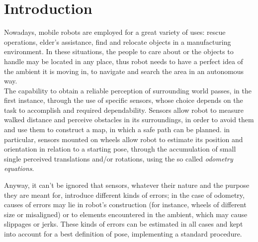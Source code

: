 \documentclass[a4paper, onecolumn]{report}
\begin{document}
\Large
\sloppy

\tableofcontents
\newpage

\chapter{Introduction}
Nowadays, mobile robots are employed for a great variety of uses: rescue operations, elder's assistance, find and relocate objects in a manufacturing environment. In these situations, the people to care about or the objects to handle may be located in any place, thus robot needs to have a perfect idea of the ambient it is moving in, to navigate and search the area in an autonomous way. \\
The capability to obtain a reliable perception of surrounding world passes, in the first instance, through the use of specific sensors, whose choice depends on the task to accomplish and required dependability. Sensors allow robot to measure walked distance and perceive obstacles in its surroundings, in order to avoid them and use them to construct a map, in which a safe path can be planned. in particular, sensors mounted on wheels allow robot to estimate its position and orientation in relation to a starting pose, through the accumulation of small single perceived translations and/or rotations, using the so called \emph{odometry equations}.

Anyway, it can't be ignored that sensors, whatever their nature and the purpose they are meant for, introduce different kinds of errors; in the case of odometry, causes of errors may lie in robot's construction (for instance, wheels of different size or misaligned) or to elements encountered in the ambient, which may cause slippages or jerks. These kinds of errors can be estimated in all cases and kept into account for a best definition of pose, implementing a standard procedure.
\end{document}
